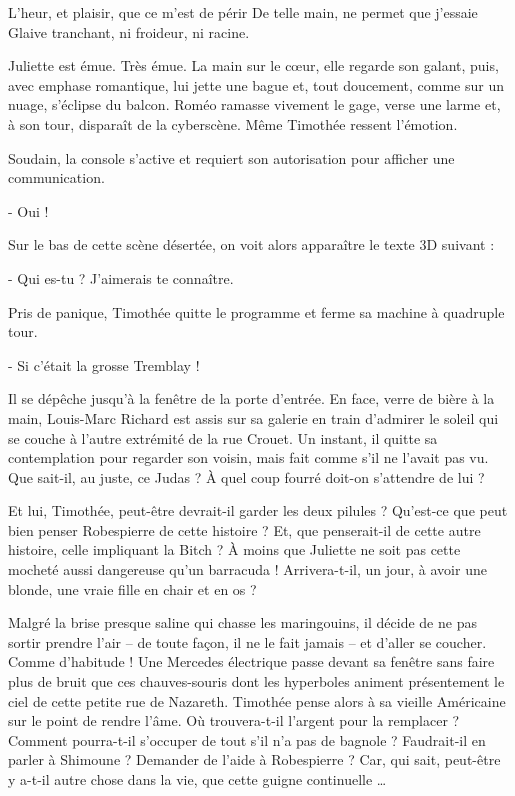     L’heur, et plaisir, que ce m’est de périr
    De telle main, ne permet que j’essaie
    Glaive tranchant, ni froideur, ni racine.

Juliette est émue. Très émue. La main sur le cœur, elle regarde son galant, puis, avec emphase romantique, lui jette une bague et, tout doucement, comme sur un nuage, s’éclipse du balcon. Roméo ramasse vivement le gage, verse une larme et, à son tour, disparaît de la cyberscène. Même Timothée ressent l’émotion.

Soudain, la console s’active et requiert son autorisation pour afficher une communication.

- Oui !

Sur le bas de cette scène désertée, on voit alors apparaître le texte 3D suivant :

- Qui es-tu ? J’aimerais te connaître.

Pris de panique, Timothée quitte le programme et ferme sa machine à quadruple tour.

- Si c’était la grosse Tremblay !

Il se dépêche jusqu’à la fenêtre de la porte d’entrée. En face, verre de bière à la main, Louis-Marc Richard est assis sur sa galerie en train d’admirer le soleil qui se couche à l’autre extrémité de la rue Crouet. Un instant, il quitte sa contemplation pour regarder son voisin, mais fait comme s’il ne l’avait pas vu.
Que sait-il, au juste, ce Judas ? À quel coup fourré doit-on s’attendre de lui ?

Et lui, Timothée, peut-être devrait-il garder les deux pilules ? Qu’est-ce que peut bien penser Robespierre de cette histoire ? Et, que penserait-il de cette autre histoire, celle impliquant la Bitch ? À moins que Juliette ne soit pas cette mocheté aussi dangereuse qu’un barracuda ! Arrivera-t-il, un jour, à avoir une blonde, une vraie fille en chair et en os ?

Malgré la brise presque saline qui chasse les maringouins, il décide de ne pas sortir prendre l’air – de toute façon, il ne le fait jamais – et d’aller se coucher. Comme d’habitude ! Une Mercedes électrique passe devant sa fenêtre sans faire plus de bruit que ces chauves-souris dont les hyperboles animent présentement le ciel de cette petite rue de Nazareth. Timothée pense alors à sa vieille Américaine sur le point de rendre l’âme. Où trouvera-t-il l’argent pour la remplacer ? Comment pourra-t-il s’occuper de tout s’il n’a pas de bagnole ? Faudrait-il en parler à Shimoune ? Demander de l’aide à Robespierre ? Car, qui sait, peut-être y a-t-il autre chose dans la vie, que cette guigne continuelle …